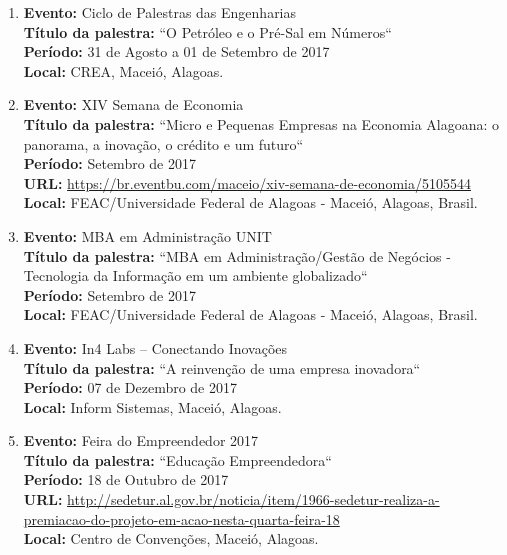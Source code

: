 \documentclass[a4paper,oneside,10pt]{article}
\begin{document}
\begin{enumerate}
  \item   \textbf{Evento:} Ciclo de Palestras das Engenharias 
  \mbox{} \\
         \textbf{Título da palestra:}  ``O Petróleo e o Pré-Sal em Números``\\
        \textbf{Período:} 31 de Agosto a 01 de Setembro de 2017\\
        \textbf{Local:} CREA, Maceió, Alagoas. 

 \item   \textbf{Evento:} XIV Semana de Economia 
  \mbox{} \\
         \textbf{Título da palestra:}  ``Micro e Pequenas Empresas na Economia Alagoana: o panorama, a inovação, o crédito e um futuro``\\
        \textbf{Período:} Setembro de 2017\\
        \textbf{URL:} \url{https://br.eventbu.com/maceio/xiv-semana-de-economia/5105544}\\
        \textbf{Local:} FEAC/Universidade Federal de Alagoas - Maceió, Alagoas, Brasil.        
        
 \item   \textbf{Evento:} MBA em Administração UNIT
  \mbox{} \\
         \textbf{Título da palestra:}  ``MBA em Administração/Gestão de Negócios - Tecnologia da Informação em um ambiente globalizado``\\
        \textbf{Período:} Setembro de 2017\\
        \textbf{Local:} FEAC/Universidade Federal de Alagoas - Maceió, Alagoas, Brasil.
        \
      
\item   \textbf{Evento:} In4 Labs – Conectando Inovações
  \mbox{} \\
       \textbf{Título da palestra:}  ``A reinvenção de uma empresa inovadora``\\
        \textbf{Período:} 07 de Dezembro de 2017\\
        \textbf{Local:} Inform Sistemas, Maceió, Alagoas.  
        
 \item   \textbf{Evento:} Feira do Empreendedor 2017
  \mbox{} \\
         \textbf{Título da palestra:}  ``Educação Empreendedora``\\
        \textbf{Período:} 18 de Outubro de 2017\\
        \textbf{URL:} \url{http://sedetur.al.gov.br/noticia/item/1966-sedetur-realiza-a-premiacao-do-projeto-em-acao-nesta-quarta-feira-18}\\
        \textbf{Local:} Centro de Convenções, Maceió, Alagoas.     
 

\end{enumerate}
\end{document}
